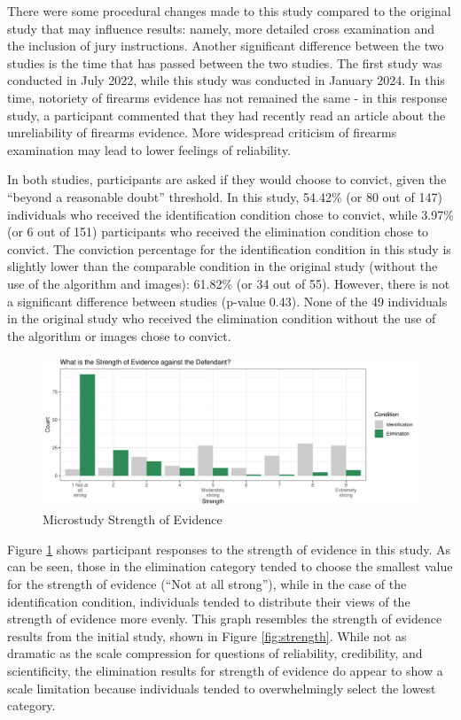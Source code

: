 \documentclass[print]{nuthesis}
\begin{document}
There were some procedural changes made to this study compared to the original study that may influence results: namely, more detailed cross examination and the inclusion of jury instructions.
Another significant difference between the two studies is the time that has passed between the two studies.
The first study was conducted in July 2022, while this study was conducted in January 2024.
In this time, notoriety of firearms evidence has not remained the same - in this response study, a participant commented that they had recently read an article about the unreliability of firearms evidence.
More widespread criticism of firearms examination may lead to lower feelings of reliability.

In both studies, participants are asked if they would choose to convict, given the ``beyond a reasonable doubt'' threshold.
In this study, 54.42\% (or 80 out of 147) individuals who received the identification condition chose to convict, while 3.97\% (or 6 out of 151) participants who received the elimination condition chose to convict.
The conviction percentage for the identification condition in this study is slightly lower than the comparable condition in the original study (without the use of the algorithm and images): 61.82\% (or 34 out of 55).
However, there is not a significant difference between studies (p-value 0.43).
None of the 49 individuals in the original study who received the elimination condition without the use of the algorithm or images chose to convict.

\begin{figure}

{\centering \includegraphics[width=\linewidth]{thesis_files/figure-latex/strength2-1} 

}

\caption{Microstudy Strength of Evidence}\label{fig:strength2}
\end{figure}

Figure \ref{fig:strength2} shows participant responses to the strength of evidence in this study.
As can be seen, those in the elimination category tended to choose the smallest value for the strength of evidence (``Not at all strong''), while in the case of the identification condition, individuals tended to distribute their views of the strength of evidence more evenly.
This graph resembles the strength of evidence results from the initial study, shown in Figure \ref{fig:strength}.
While not as dramatic as the scale compression for questions of reliability, credibility, and scientificity, the elimination results for strength of evidence do appear to show a scale limitation because individuals tended to overwhelmingly select the lowest category.
\end{document}
